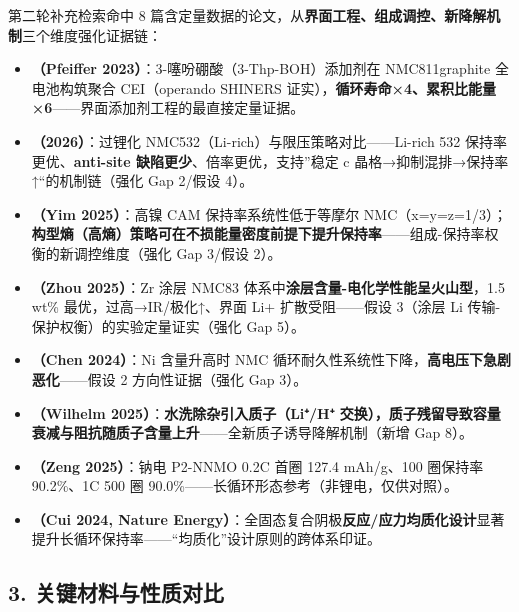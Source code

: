 \documentclass[12pt,a4paper]{ctexart}
\providecommand{\tightlist}{%
  \setlength{\itemsep}{0pt}\setlength{\parskip}{0pt}}
\begin{document}
第二轮补充检索命中 8 篇含定量数据的论文，从\textbf{界面工程、组成调控、新降解机制}三个维度强化证据链：

\begin{itemize}
\tightlist
\item
  \textbf{\cite{p43}（Pfeiffer 2023）}：3-噻吩硼酸（3-Thp-BOH）添加剂在 NMC811\textbar\textbar graphite 全电池构筑聚合 CEI（operando SHINERS 证实），\textbf{循环寿命×4、累积比能量×6}------界面添加剂工程的最直接定量证据。
\item
  \textbf{\cite{p44}（2026）}：过锂化 NMC532（Li-rich）与限压策略对比------Li-rich 532 保持率更优、\textbf{anti-site 缺陷更少}、倍率更优，支持''稳定 c 晶格→抑制混排→保持率↑``的机制链（强化 Gap 2/假设 4）。
\item
  \textbf{\cite{p45}（Yim 2025）}：高镍 CAM 保持率系统性低于等摩尔 NMC（x=y=z=1/3）；\textbf{构型熵（高熵）策略可在不损能量密度前提下提升保持率}------组成-保持率权衡的新调控维度（强化 Gap 3/假设 2）。
\item
  \textbf{\cite{p46}（Zhou 2025）}：Zr 涂层 NMC83 体系中\textbf{涂层含量-电化学性能呈火山型}，1.5 wt\% 最优，过高→IR/极化↑、界面 Li+ 扩散受阻------假设 3（涂层 Li 传输-保护权衡）的实验定量证实（强化 Gap 5）。
\item
  \textbf{\cite{p47}（Chen 2024）}：Ni 含量升高时 NMC 循环耐久性系统性下降，\textbf{高电压下急剧恶化}------假设 2 方向性证据（强化 Gap 3）。
\item
  \textbf{\cite{p48}（Wilhelm 2025）}：\textbf{水洗除杂引入质子（Li⁺/H⁺ 交换），质子残留导致容量衰减与阻抗随质子含量上升}------全新质子诱导降解机制（新增 Gap 8）。
\item
  \textbf{\cite{p49}（Zeng 2025）}：钠电 P2-NNMO 0.2C 首圈 127.4 mAh/g、100 圈保持率 90.2\%、1C 500 圈 90.0\%------长循环形态参考（非锂电，仅供对照）。
\item
  \textbf{\cite{p50}（Cui 2024, Nature Energy）}：全固态复合阴极\textbf{反应/应力均质化设计}显著提升长循环保持率------``均质化''设计原则的跨体系印证。
\end{itemize}

\subsection{3. 关键材料与性质对比}\label{ux5173ux952eux6750ux6599ux4e0eux6027ux8d28ux5bf9ux6bd4}
\end{document}
